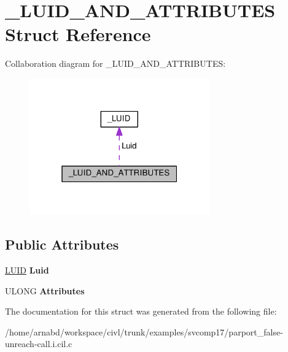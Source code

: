 \hypertarget{struct__LUID__AND__ATTRIBUTES}{}\section{\+\_\+\+L\+U\+I\+D\+\_\+\+A\+N\+D\+\_\+\+A\+T\+T\+R\+I\+B\+U\+T\+E\+S Struct Reference}
\label{struct__LUID__AND__ATTRIBUTES}


Collaboration diagram for \+\_\+\+L\+U\+I\+D\+\_\+\+A\+N\+D\+\_\+\+A\+T\+T\+R\+I\+B\+U\+T\+E\+S\+:
\nopagebreak
\begin{figure}[H]
\begin{center}
\leavevmode
\includegraphics[width=220pt]{struct__LUID__AND__ATTRIBUTES__coll__graph}
\end{center}
\end{figure}
\subsection*{Public Attributes}
\begin{DoxyCompactItemize}
\item 
\hypertarget{struct__LUID__AND__ATTRIBUTES_a87ba6ddd98dbc6cb4af380e69d31233a}{}\hyperlink{struct__LUID}{L\+U\+I\+D} {\bfseries Luid}\label{struct__LUID__AND__ATTRIBUTES_a87ba6ddd98dbc6cb4af380e69d31233a}

\item 
\hypertarget{struct__LUID__AND__ATTRIBUTES_aaa4581db6230461bf219f4e3bc6810c0}{}U\+L\+O\+N\+G {\bfseries Attributes}\label{struct__LUID__AND__ATTRIBUTES_aaa4581db6230461bf219f4e3bc6810c0}

\end{DoxyCompactItemize}


The documentation for this struct was generated from the following file\+:\begin{DoxyCompactItemize}
\item 
/home/arnabd/workspace/civl/trunk/examples/svcomp17/parport\+\_\+false-\/unreach-\/call.\+i.\+cil.\+c\end{DoxyCompactItemize}
